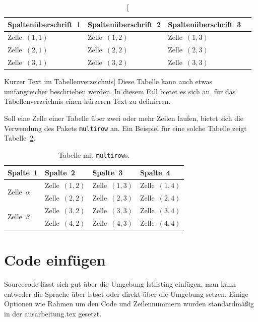 \begin{table}
	\center
	\begin{tabular}{l l l l}
		\toprule
		\bfseries{Spaltenüberschrift~1} & \bfseries{Spaltenüberschrift~2} & \bfseries{Spaltenüberschrift~3} \\
		\midrule
		Zelle~$(1,1)$                   & Zelle~$(1,2)$                   & Zelle~$(1,3)$                   \\
		Zelle~$(2,1)$                   & Zelle~$(2,2)$                   & Zelle~$(2,3)$                   \\
		Zelle~$(3,1)$                   & Zelle~$(3,2)$                   & Zelle~$(3,3)$                   \\
		\bottomrule
	\end{tabular}
	\caption
  	[Kurzer Text im Tabellenverzeichnis]
  	{Diese Tabelle kann auch etwas umfangreicher beschrieben werden. In diesem Fall bietet es sich an, für das Tabellenverzeichnis einen kürzeren Text zu definieren.}
  \label{tab:myVeryFirstTable}
\end{table}

Soll eine Zelle einer Tabelle über zwei oder mehr Zeilen laufen, bietet sich die Verwendung des Pakets {\tt multirow} an. Ein Beispiel für eine solche Tabelle zeigt Tabelle~\ref{tab:myMultiRowTable}.

\begin{table}
	\center
	\begin{tabular}{l l l l}
		\toprule
		\bfseries{Spalte~1} & \bfseries{Spalte~2} & \bfseries{Spalte~3} & \bfseries{Spalte~4} \\
		\midrule
		\multirow{2}{*}{Zelle~$\alpha$} & Zelle~$(1,2)$ & Zelle~$(1,3)$ & Zelle~$(1,4)$  \\
	                                  & Zelle~$(2,2)$ & Zelle~$(2,3)$ & Zelle~$(2,4)$  \\
		\midrule
		\multirow{2}{*}{Zelle~$\beta$}  & Zelle~$(3,2)$ & Zelle~$(3,3)$ & Zelle~$(3,4)$  \\
	                                  & Zelle~$(4,2)$ & Zelle~$(4,3)$ & Zelle~$(4,4)$  \\
		\bottomrule
	\end{tabular}
	\caption
  	{Tabelle mit {\tt multirow}s.}
  \label{tab:myMultiRowTable}
\end{table}

\section{Code einfügen}
Sourcecode lässt sich gut über die Umgebung lstlisting einfügen, man kann entweder die Sprache über lstset oder
direkt über die Umgebung setzen. Einige Optionen wie Rahmen um den Code und Zeilennummern wurden standardmäßig in der ausarbeitung.tex gesetzt. 

